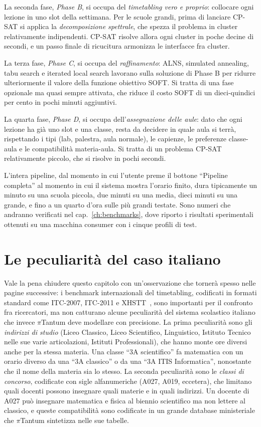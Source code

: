 La seconda fase, \emph{Phase B}, si occupa del
\emph{timetabling vero e proprio}: collocare ogni lezione in
uno slot della settimana. Per le scuole grandi, prima di
lanciare CP-SAT si applica la \emph{decomposizione spettrale},
che spezza il problema in cluster relativamente indipendenti.
CP-SAT risolve allora ogni cluster in poche decine di
secondi, e un passo finale di ricucitura armonizza le
interfacce fra cluster.

La terza fase, \emph{Phase C}, si occupa del
\emph{raffinamento}: ALNS, simulated annealing, tabu search e
iterated local search lavorano sulla soluzione di Phase B per
ridurre ulteriormente il valore della funzione obiettivo
SOFT. Si tratta di una fase opzionale ma quasi sempre
attivata, che riduce il costo SOFT di un dieci-quindici per
cento in pochi minuti aggiuntivi.

La quarta fase, \emph{Phase D}, si occupa
dell'\emph{assegnazione delle aule}: dato che ogni lezione
ha gi\`a uno slot e una classe, resta da decidere in quale
aula si terr\`a, rispettando i tipi (lab, palestra, aula
normale), le capienze, le preferenze classe-aula e le
compatibilit\`a materia-aula. Si tratta di un problema CP-SAT
relativamente piccolo, che si risolve in pochi secondi.

L'intera pipeline, dal momento in cui l'utente preme il
bottone ``Pipeline completa'' al momento in cui il
sistema mostra l'orario finito, dura tipicamente un minuto su
una scuola piccola, due minuti su una media, dieci minuti su
una grande, e fino a un quarto d'ora sulle pi\`u grandi
testate. Sono numeri che andranno verificati nel
cap.~\ref{ch:benchmarks}, dove riporto i risultati
sperimentali ottenuti su una macchina consumer con i cinque
profili di test.

\section{Le peculiarit\`a del caso italiano}

Vale la pena chiudere questo capitolo con un'osservazione che
torner\`a spesso nelle pagine successive: i benchmark
internazionali del timetabling, codificati in formati standard
come ITC-2007, ITC-2011 e XHSTT~\parencite{mccollum2010},
sono importanti per il confronto fra ricercatori, ma non
catturano alcune peculiarit\`a del sistema scolastico italiano
che invece $\pi$Tantum deve modellare con precisione. La
prima peculiarit\`a sono gli \emph{indirizzi di studio} (Liceo
Classico, Liceo Scientifico, Linguistico, Istituto Tecnico
nelle sue varie articolazioni, Istituti Professionali), che
hanno monte ore diversi anche per la stessa materia. Una
classe ``3A scientifico'' fa matematica con un orario diverso
da una ``3A classico'' o da una ``3A ITIS Informatica'',
nonostante che il nome della materia sia lo stesso. La seconda
peculiarit\`a sono le \emph{classi di concorso}, codificate
con sigle alfanumeriche (A027, A019, eccetera), che limitano
quali docenti possono insegnare quali materie e in quali
indirizzi. Un docente di A027 pu\`o insegnare matematica e
fisica al biennio scientifico ma non lettere al classico, e
queste compatibilit\`a sono codificate in un grande database
ministeriale che $\pi$Tantum sintetizza nelle sue tabelle.

